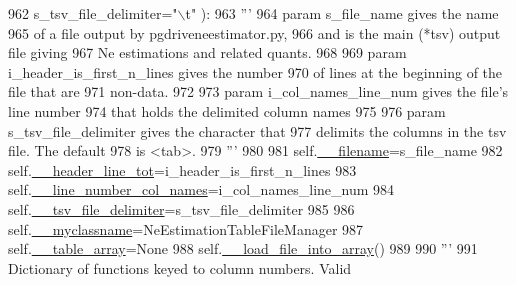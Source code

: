 \begin{DoxyCode}
962                     s\_tsv\_file\_delimiter=\textcolor{stringliteral}{"\(\backslash\)t"} ):
963         \textcolor{stringliteral}{'''}
964 \textcolor{stringliteral}{        param s\_file\_name gives the name}
965 \textcolor{stringliteral}{        of a file output by pgdriveneestimator.py,}
966 \textcolor{stringliteral}{        and is the main (*tsv) output file giving}
967 \textcolor{stringliteral}{        Ne estimations and related quants.}
968 \textcolor{stringliteral}{}
969 \textcolor{stringliteral}{        param i\_header\_is\_first\_n\_lines gives the number }
970 \textcolor{stringliteral}{        of lines at the beginning of the file that are}
971 \textcolor{stringliteral}{        non-data.}
972 \textcolor{stringliteral}{}
973 \textcolor{stringliteral}{        param i\_col\_names\_line\_num gives the file's line number}
974 \textcolor{stringliteral}{        that holds the delimited column names}
975 \textcolor{stringliteral}{        }
976 \textcolor{stringliteral}{        param s\_tsv\_file\_delimiter gives the character that}
977 \textcolor{stringliteral}{        delimits the columns in the tsv file. The default}
978 \textcolor{stringliteral}{        is <tab>.}
979 \textcolor{stringliteral}{        '''}
980 
981         self.\hyperlink{classnegui_1_1pgutilityclasses_1_1NeEstimationTableFileManager_a2dee941ba30c00341a629ed595eee242}{\_\_filename}=s\_file\_name
982         self.\hyperlink{classnegui_1_1pgutilityclasses_1_1NeEstimationTableFileManager_ad4792fd529282d2e6ecf04bf6af6c675}{\_\_header\_line\_tot}=i\_header\_is\_first\_n\_lines
983         self.\hyperlink{classnegui_1_1pgutilityclasses_1_1NeEstimationTableFileManager_afdd782f0021eb81e8962c79355a4eb7e}{\_\_line\_number\_col\_names}=i\_col\_names\_line\_num
984         self.\hyperlink{classnegui_1_1pgutilityclasses_1_1NeEstimationTableFileManager_a9e26b016ac019f027b0575af48ee0e95}{\_\_tsv\_file\_delimiter}=s\_tsv\_file\_delimiter
985 
986         self.\hyperlink{classnegui_1_1pgutilityclasses_1_1NeEstimationTableFileManager_a4492edfe0f609b698bf637cc06c9c1e7}{\_\_myclassname}=NeEstimationTableFileManager
987         self.\hyperlink{classnegui_1_1pgutilityclasses_1_1NeEstimationTableFileManager_a7fda8f29a1d3c13b8804060049fd2e40}{\_\_table\_array}=\textcolor{keywordtype}{None}
988         self.\hyperlink{classnegui_1_1pgutilityclasses_1_1NeEstimationTableFileManager_a20a80a309b26316ab610ea47fe7ba52d}{\_\_load\_file\_into\_array}()
989                 
990         \textcolor{stringliteral}{'''}
991 \textcolor{stringliteral}{        Dictionary of functions keyed to column numbers. Valid}

\end{DoxyCode}
